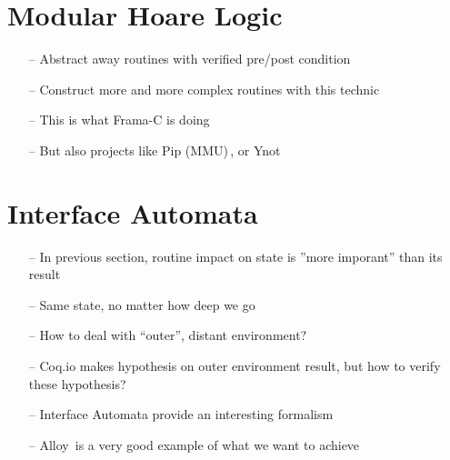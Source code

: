 \section{Modular Hoare Logic} %

\begin{itemize}
\item[--] Abstract away routines with verified pre/post condition
\item[--] Construct more and more complex routines with this technic
\item[--] This is what Frama-C is doing
\item[--] But also projects like Pip (MMU)\,\cite{jomaa2016mmu}, or Ynot
\end{itemize}

\section{Interface Automata} %

\begin{itemize}
\item[--] In previous section, routine impact on state is ''more imporant'' than
  its result
\item[--] Same state, no matter how deep we go
\item[--] How to deal with ``outer'', distant environment?
\item[--] Coq.io makes hypothesis on outer environment result, but how to verify
  these hypothesis?
\item[--] Interface Automata provide an interesting formalism
\item[--] Alloy\,\cite{jackson2012alloy} is a very good example of what we want
  to achieve
\end{itemize}

